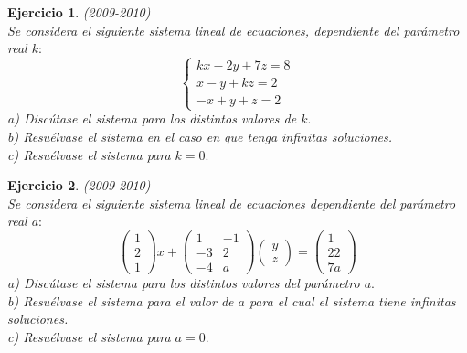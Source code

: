 \documentclass[12pt, a4paper]{amsart}
\newtheorem{ejer}{Ejercicio}
\begin{document}
\begin{ejer}\em (2009-2010)\\
Se considera el siguiente sistema lineal de ecuaciones, dependiente del parámetro real $k:$
\begin{equation*}
\left \{ \begin{matrix} kx-2y+7z=8
\\ x-y+kz=2
\\ -x+y+z=2 \end{matrix}\right. 
\end{equation*}
a) Discútase el sistema para los distintos valores de $k.$\\
b) Resuélvase el sistema en el caso en que tenga infinitas soluciones.\\
c) Resuélvase el sistema para $k=0.$
\end{ejer}

\begin{ejer}\em (2009-2010)\\
Se considera el siguiente sistema lineal de ecuaciones dependiente del parámetro real $a:$
\begin{equation*}
\begin{pmatrix}
1
\\ 2
\\ 1 \end{pmatrix} x +
\begin{pmatrix}
1 & -1
\\ -3 & 2
\\ -4 & a \end{pmatrix}
\begin{pmatrix}
y
\\ z \end{pmatrix}=
\begin{pmatrix}
1
\\ 22
\\ 7a \end{pmatrix}
\end{equation*}
a) Discútase el sistema para los distintos valores del parámetro $a.$\\
b) Resuélvase el sistema para el valor de $a$ para el cual el sistema tiene infinitas soluciones.\\
c) Resuélvase el sistema para $a=0.$
\end{ejer}
\end{document}
